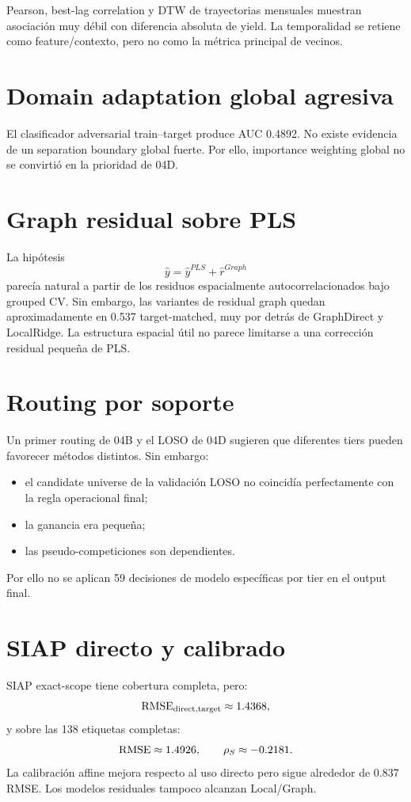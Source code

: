 Pearson, best-lag correlation y DTW de trayectorias mensuales muestran asociación muy débil con
diferencia absoluta de yield. La temporalidad se retiene como feature/contexto, pero no como
la métrica principal de vecinos.

\section{Domain adaptation global agresiva}

El clasificador adversarial train--target produce AUC 0.4892. No existe evidencia de un
separation boundary global fuerte. Por ello, importance weighting global no se convirtió en
la prioridad de 04D.

\section{Graph residual sobre PLS}

La hipótesis
\[
\hat y=\hat y^{PLS}+\hat r^{Graph}
\]
parecía natural a partir de los residuos espacialmente autocorrelacionados bajo grouped CV.
Sin embargo, las variantes de residual graph quedan aproximadamente en 0.537 target-matched,
muy por detrás de GraphDirect y LocalRidge. La estructura espacial útil no parece limitarse a
una corrección residual pequeña de PLS.

\section{Routing por soporte}

Un primer routing de 04B y el LOSO de 04D sugieren que diferentes tiers pueden favorecer
métodos distintos. Sin embargo:
\begin{itemize}
\item el candidate universe de la validación LOSO no coincidía perfectamente con la regla
operacional final;
\item la ganancia era pequeña;
\item las pseudo-competiciones son dependientes.
\end{itemize}
Por ello no se aplican 59 decisiones de modelo específicas por tier en el output final.

\section{SIAP directo y calibrado}

SIAP exact-scope tiene cobertura completa, pero:
\[
\operatorname{RMSE}_{\mathrm{direct,target}}\approx1.4368,
\]
y sobre las 138 etiquetas completas:
\[
\operatorname{RMSE}\approx1.4926,\qquad
\rho_S\approx-0.2181.
\]
La calibración affine mejora respecto al uso directo pero sigue alrededor de 0.837 RMSE. Los
modelos residuales tampoco alcanzan Local/Graph.

